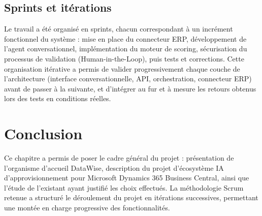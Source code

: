 \subsection{Sprints et itérations}
Le travail a été organisé en sprints, chacun correspondant à un incrément fonctionnel du système : mise en place du connecteur ERP, développement de l'agent conversationnel, implémentation du moteur de scoring, sécurisation du processus de validation (Human-in-the-Loop), puis tests et corrections. Cette organisation itérative a permis de valider progressivement chaque couche de l'architecture (interface conversationnelle, API, orchestration, connecteur ERP) avant de passer à la suivante, et d'intégrer au fur et à mesure les retours obtenus lors des tests en conditions réelles.
 
\section{Conclusion}
Ce chapitre a permis de poser le cadre général du projet : présentation de l'organisme d'accueil DataWise, description du projet d'écosystème IA d'approvisionnement pour Microsoft Dynamics 365 Business Central, ainsi que l'étude de l'existant ayant justifié les choix effectués. La méthodologie Scrum retenue a structuré le déroulement du projet en itérations successives, permettant une montée en charge progressive des fonctionnalités.
 